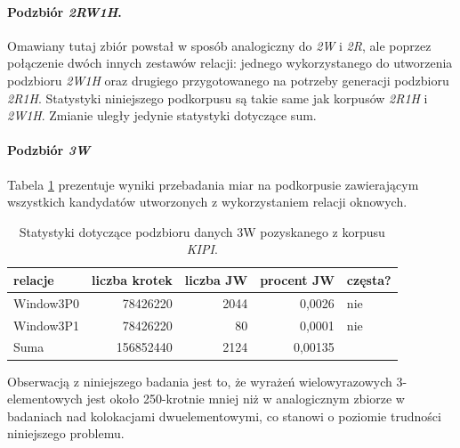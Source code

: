 \documentclass[11pt,a4paper]{llncs}
\begin{document}
\paragraph{Podzbiór \protect\textit{2RW1H}.}
Omawiany tutaj zbiór powstał w sposób analogiczny do \emph{2W} i \emph{2R}, ale poprzez połączenie dwóch innych zestawów relacji: jednego wykorzystanego do utworzenia podzbioru \emph{2W1H} oraz drugiego przygotowanego na potrzeby generacji podzbioru \emph{2R1H}.
Statystyki niniejszego podkorpusu są takie same jak korpusów \emph{2R1H} i \emph{2W1H}.
Zmianie uległy jedynie statystyki dotyczące sum.


\paragraph{Podzbiór \protect\textit{3W}}
Tabela \ref{KIPI_3W_stats} prezentuje wyniki przebadania miar na podkorpusie zawierającym wszystkich kandydatów utworzonych z wykorzystaniem relacji oknowych.

\begin{table}[h!]
\centering
\begin{tabular}{ l | r | r | r | l }
	\toprule
	relacje 	& liczba krotek & liczba JW & procent JW & częsta? 	\\
	\midrule
	Window3P0	&	78426220	&	2044	&	0,0026	&	nie	\\
	Window3P1	&	78426220	&	80	&	0,0001 &	nie	\\
	\midrule									
	Suma		&	156852440	&	2124	&	0,00135	&		\\
	\bottomrule
\end{tabular}
\caption[Statystyki podzbioru danych \emph{KIPI} 3W]{Statystyki dotyczące podzbioru danych 3W pozyskanego z korpusu \emph{KIPI}.}
\label{KIPI_3W_stats}
\end{table}

Obserwacją z niniejszego badania jest to, że wyrażeń wielowyrazowych 3-elementowych jest około 250-krotnie mniej niż w analogicznym zbiorze w badaniach nad kolokacjami dwuelementowymi, co stanowi o poziomie trudności niniejszego problemu.
\end{document}
